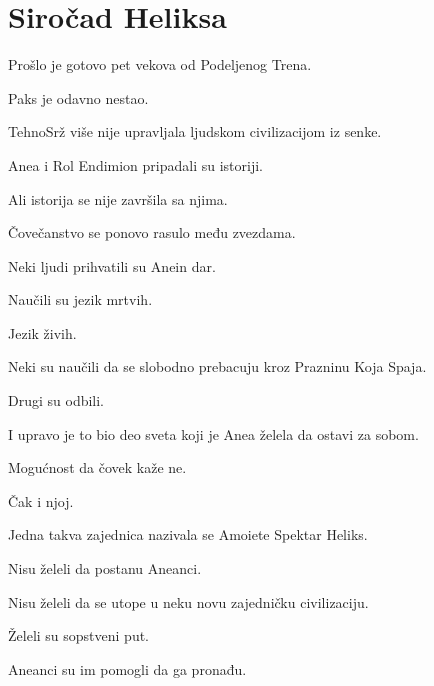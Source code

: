 
\chapter{Siročad Heliksa}


Prošlo je gotovo pet vekova od Podeljenog Trena.

\bigskip

Paks je odavno nestao.

TehnoSrž više nije upravljala ljudskom civilizacijom iz senke.

Anea i Rol Endimion pripadali su istoriji.

\bigskip

Ali istorija se nije završila sa njima.

\bigskip

Čovečanstvo se ponovo rasulo među zvezdama.

\bigskip

Neki ljudi prihvatili su Anein dar.

Naučili su jezik mrtvih.

Jezik živih.

Neki su naučili da se slobodno prebacuju kroz Prazninu Koja Spaja.

\bigskip

Drugi su odbili.

\bigskip

I upravo je to bio deo sveta koji je Anea želela da ostavi za sobom.

\bigskip

Mogućnost da čovek kaže ne.

\bigskip

Čak i njoj.

\bigskip

Jedna takva zajednica nazivala se Amoiete Spektar Heliks.

\bigskip

Nisu želeli da postanu Aneanci.

Nisu želeli da se utope u neku novu zajedničku civilizaciju.

\bigskip

Želeli su sopstveni put.

\bigskip

Aneanci su im pomogli da ga pronađu.

\bigskip

